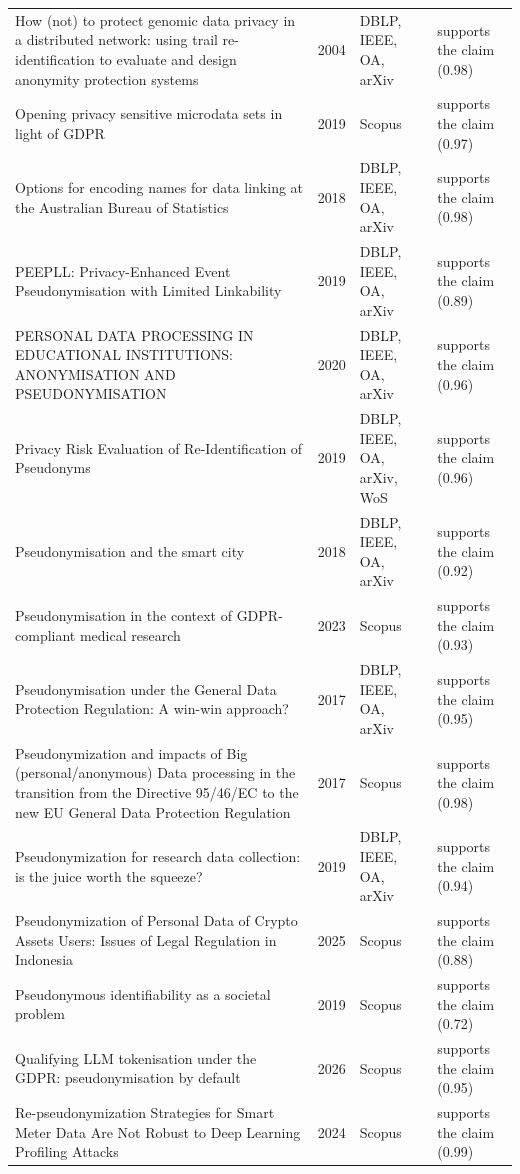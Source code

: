 \begin{longtable}{@{}%
  >{\raggedright\arraybackslash}p{}c%
  >{\raggedright\arraybackslash}p{}%
  >{\raggedright\arraybackslash}p{}@{}}
How (not) to protect genomic data privacy in a distributed network: using trail re-identification to evaluate and design anonymity protection systems & 2004 & DBLP, IEEE, OA, arXiv & supports the claim (0.98) \\
Opening privacy sensitive microdata sets in light of GDPR & 2019 & Scopus & supports the claim (0.97) \\
Options for encoding names for data linking at the Australian Bureau of Statistics & 2018 & DBLP, IEEE, OA, arXiv & supports the claim (0.98) \\
PEEPLL: Privacy-Enhanced Event Pseudonymisation with Limited Linkability & 2019 & DBLP, IEEE, OA, arXiv & supports the claim (0.89) \\
PERSONAL DATA PROCESSING IN EDUCATIONAL INSTITUTIONS: ANONYMISATION AND PSEUDONYMISATION & 2020 & DBLP, IEEE, OA, arXiv & supports the claim (0.96) \\
Privacy Risk Evaluation of Re-Identification of Pseudonyms & 2019 & DBLP, IEEE, OA, arXiv, WoS & supports the claim (0.96) \\
Pseudonymisation and the smart city & 2018 & DBLP, IEEE, OA, arXiv & supports the claim (0.92) \\
Pseudonymisation in the context of GDPR-compliant medical research & 2023 & Scopus & supports the claim (0.93) \\
Pseudonymisation under the General Data Protection Regulation: A win-win approach? & 2017 & DBLP, IEEE, OA, arXiv & supports the claim (0.95) \\
Pseudonymization and impacts of Big (personal/anonymous) Data processing in the transition from the Directive 95/46/EC to the new EU General Data Protection Regulation & 2017 & Scopus & supports the claim (0.98) \\
Pseudonymization for research data collection: is the juice worth the squeeze? & 2019 & DBLP, IEEE, OA, arXiv & supports the claim (0.94) \\
Pseudonymization of Personal Data of Crypto Assets Users: Issues of Legal Regulation in Indonesia & 2025 & Scopus & supports the claim (0.88) \\
Pseudonymous identifiability as a societal problem & 2019 & Scopus & supports the claim (0.72) \\
Qualifying LLM tokenisation under the GDPR: pseudonymisation by default & 2026 & Scopus & supports the claim (0.95) \\
Re-pseudonymization Strategies for Smart Meter Data Are Not Robust to Deep Learning Profiling Attacks & 2024 & Scopus & supports the claim (0.99) \\

\end{longtable}
